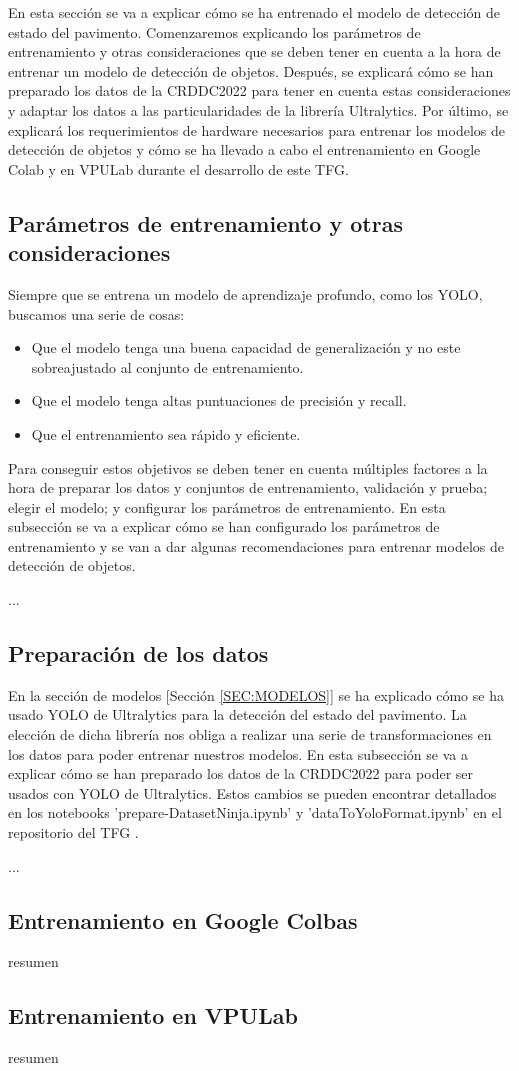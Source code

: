 En esta sección se va a explicar cómo se ha entrenado el modelo de detección de estado del pavimento. Comenzaremos explicando los parámetros de entrenamiento y otras consideraciones que se deben tener en cuenta a la hora de entrenar un modelo de detección de objetos. Después, se explicará cómo se han preparado los datos de la CRDDC2022 para tener en cuenta estas consideraciones y adaptar los datos a las particularidades de la librería Ultralytics. Por último, se explicará los requerimientos de hardware necesarios para entrenar los modelos de detección de objetos y cómo se ha llevado a cabo el entrenamiento en Google Colab y en VPULab durante el desarrollo de este TFG.

\subsection{Parámetros de entrenamiento y otras consideraciones}
Siempre que se entrena un modelo de aprendizaje profundo, como los YOLO, buscamos una serie de cosas:
\begin{itemize}
    \item Que el modelo tenga una buena capacidad de generalización y no este sobreajustado al conjunto de entrenamiento.
    \item Que el modelo tenga altas puntuaciones de precisión y recall.
    \item Que el entrenamiento sea rápido y eficiente.
\end{itemize}
Para conseguir estos objetivos se deben tener en cuenta múltiples factores a la hora de preparar los datos y conjuntos de entrenamiento, validación y prueba; elegir el modelo; y configurar los parámetros de entrenamiento. En esta subsección se va a explicar cómo se han configurado los parámetros de entrenamiento y se van a dar algunas recomendaciones para entrenar modelos de detección de objetos.

...

\subsection{Preparación de los datos}
En la sección de modelos [Sección \ref{SEC:MODELOS}] se ha explicado cómo se ha usado YOLO de Ultralytics para la detección del estado del pavimento. La elección de dicha librería nos obliga a realizar una serie de transformaciones en los datos para poder entrenar nuestros modelos. En esta subsección se va a explicar cómo se han preparado los datos de la CRDDC2022 para poder ser usados con YOLO de Ultralytics. Estos cambios se pueden encontrar detallados en los notebooks 'prepare-DatasetNinja.ipynb' y 'dataToYoloFormat.ipynb' en el repositorio del TFG \cite{TFG_Repository}.

...

\subsection{Entrenamiento en Google Colbas}
resumen

\subsection{Entrenamiento en VPULab}
resumen